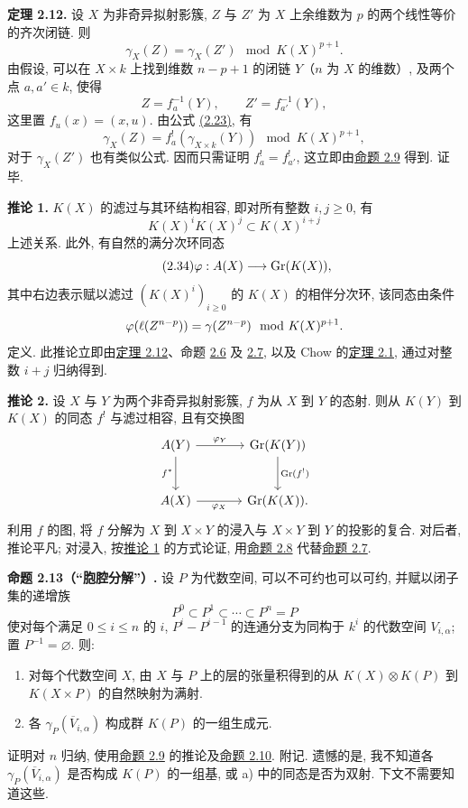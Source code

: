 \textbf{定理 2.12.} 设 $X$ 为非奇异拟射影簇, $Z$ 与 $Z'$ 为 $X$ 上余维数为 $p$ 的两个线性等价的齐次闭链. 则
\begin{equation}\tag{2.33}
 \gamma_X(Z)=\gamma_X(Z')\mod K(X)^{p+1}.
\end{equation}
由假设, 可以在 $X\times k$ 上找到维数 $n-p+1$ 的闭链 $Y$（$n$ 为 $X$ 的维数）, 及两个点 $a,a'\in k$, 使得
\[
 Z=f_a^{-1}(Y),\qquad Z'=f_{a'}^{-1}(Y),
\]
这里置 $f_u(x)=(x,u)$. 由公式 \hyperlink{sga6.e00.eq.2-23}{(2.23)}, 有
\[
 \gamma_X(Z)=f_a^!(\gamma_{X\times k}(Y))\mod K(X)^{p+1},
\]
对于 $\gamma_X(Z')$ 也有类似公式. 因而只需证明 $f_a^!=f_{a'}^!$, 这立即由\hyperlink{sga6.e00.prop.2-9}{命题 2.9} 得到. 证毕.

\textbf{推论 1.} $K(X)$ 的滤过与其环结构相容, 即对所有整数 $i,j\geq 0$, 有
\[
 K(X)^iK(X)^j\subset K(X)^{i+j}
\]
上述关系. 此外, 有自然的满分次环同态
\begin{equation}\tag{2.34}
 \varphi:A(X)\longrightarrow \operatorname{Gr}(K(X)),
\end{equation}
其中右边表示赋以滤过 $(K(X)^i)_{i\geq 0}$ 的 $K(X)$ 的相伴分次环, 该同态由条件
\[
 \varphi(\ell(Z^{n-p}))=\gamma(Z^{n-p})\mod K(X)^{p+1}.
\]
定义. 此推论立即由\hyperlink{sga6.e00.thm.2-12}{定理 2.12}、命题 \hyperlink{sga6.e00.prop.2-6}{2.6} 及 \hyperlink{sga6.e00.prop.2-7}{2.7}, 以及 Chow 的\hyperlink{sga6.e00.thm.2-1}{定理 2.1}, 通过对整数 $i+j$ 归纳得到.

\textbf{推论 2.} 设 $X$ 与 $Y$ 为两个非奇异拟射影簇, $f$ 为从 $X$ 到 $Y$ 的态射. 则从 $K(Y)$ 到 $K(X)$ 的同态 $f^!$ 与滤过相容, 且有交换图
\[
\begin{tikzcd}[column sep=large,row sep=large]
A(Y) \arrow[r,"\varphi_Y"] \arrow[d,"f^*"'] & \Gr(K(Y)) \arrow[d,"\Gr(f^!)"]\\
A(X) \arrow[r,"\varphi_X"'] & \Gr(K(X)).
\end{tikzcd}
\]
利用 $f$ 的图, 将 $f$ 分解为 $X$ 到 $X\times Y$ 的浸入与 $X\times Y$ 到 $Y$ 的投影的复合. 对后者, 推论平凡; 对浸入, 按\hyperlink{sga6.e00.cor.1}{推论 1} 的方式论证, 用\hyperlink{sga6.e00.prop.2-8}{命题 2.8} 代替\hyperlink{sga6.e00.prop.2-7}{命题 2.7}.

\textbf{命题 2.13（“胞腔分解”）.} 设 $P$ 为代数空间, 可以不可约也可以可约, 并赋以闭子集的递增族
\[
P^0\subset P^1\subset\cdots\subset P^n=P
\]
使对每个满足 $0\leq i\leq n$ 的 $i$, $P^i-P^{i-1}$ 的连通分支为同构于 $k^i$ 的代数空间 $V_{i,\alpha}$; 置 $P^{-1}=\varnothing$. 则:
\begin{enumerate}[label=\alph*)]
\item 对每个代数空间 $X$, 由 $X$ 与 $P$ 上的层的张量积得到的从 $K(X)\otimes K(P)$ 到 $K(X\times P)$ 的自然映射为满射.
\item 各 $\gamma_P(\overline{V}_{i,\alpha})$ 构成群 $K(P)$ 的一组生成元.
\end{enumerate}
证明对 $n$ 归纳, 使用\hyperlink{sga6.e00.prop.2-9}{命题 2.9} 的推论及\hyperlink{sga6.e00.prop.2-10}{命题 2.10}. 附记. 遗憾的是, 我不知道各 $\gamma_P(\overline{V}_{i,\alpha})$ 是否构成 $K(P)$ 的一组基, 或 a) 中的同态是否为双射. 下文不需要知道这些.

